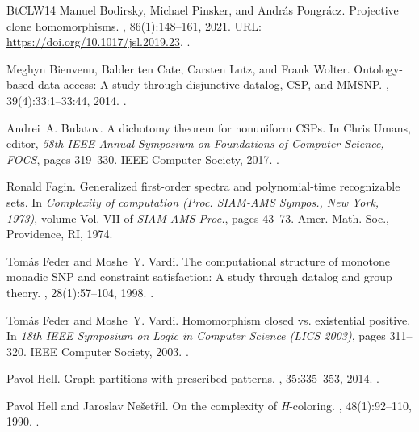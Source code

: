 \documentclass[10pt,a4paper]{amsart}
\theoremstyle{plain}
\theoremstyle{definition}
\numberwithin{equation}{section}
\begin{document}
\begin{thebibliography}{BtCLW14}
Manuel Bodirsky, Michael Pinsker, and Andr{\'{a}}s Pongr{\'{a}}cz.
\newblock Projective clone homomorphisms.
, 86(1):148--161, 2021.
\newblock URL: \url{https://doi.org/10.1017/jsl.2019.23}, \href {https://doi.org/10.1017/JSL.2019.23} {}.

Meghyn Bienvenu, Balder ten Cate, Carsten Lutz, and Frank Wolter.
\newblock Ontology-based data access: {A} study through disjunctive datalog, {CSP}, and {MMSNP}.
, 39(4):33:1--33:44, 2014.
\newblock \href {https://doi.org/10.1145/2661643} {}.

Andrei~A. Bulatov.
\newblock A dichotomy theorem for nonuniform {CSPs}.
\newblock In Chris Umans, editor, {\em 58th {IEEE} Annual Symposium on Foundations of Computer Science, {FOCS}}, pages 319--330. {IEEE} Computer Society, 2017.
\newblock \href {https://doi.org/10.1109/FOCS.2017.37} {}.

Ronald Fagin.
\newblock Generalized first-order spectra and polynomial-time recognizable sets.
\newblock In {\em Complexity of computation ({P}roc. {SIAM}-{AMS} {S}ympos., {N}ew {Y}ork, 1973)}, volume Vol. VII of {\em SIAM-AMS Proc.}, pages 43--73. Amer. Math. Soc., Providence, RI, 1974.

Tom{\'{a}}s Feder and Moshe~Y. Vardi.
\newblock The computational structure of monotone monadic {SNP} and constraint satisfaction: {A} study through datalog and group theory.
, 28(1):57--104, 1998.
\newblock \href {https://doi.org/10.1137/S0097539794266766} {}.

Tom{\'{a}}s Feder and Moshe~Y. Vardi.
\newblock Homomorphism closed vs. existential positive.
\newblock In {\em 18th {IEEE} Symposium on Logic in Computer Science {(LICS} 2003)}, pages 311--320. {IEEE} Computer Society, 2003.
\newblock \href {https://doi.org/10.1109/LICS.2003.1210071} {}.

Pavol Hell.
\newblock Graph partitions with prescribed patterns.
, 35:335--353, 2014.
\newblock \href {https://doi.org/10.1016/j.ejc.2013.06.043} {}.

Pavol Hell and Jaroslav Ne{\v s}et{\v r}il.
\newblock On the complexity of \emph{H}-coloring.
, 48(1):92--110, 1990.
\newblock \href {https://doi.org/10.1016/0095-8956(90)90132-J} {}.


\end{thebibliography}
\end{document}
